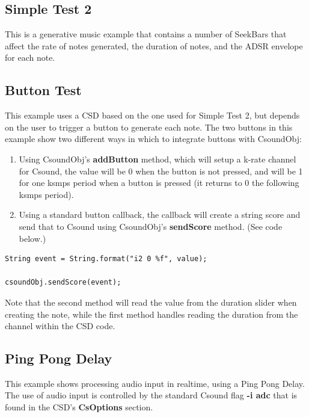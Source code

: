 \documentclass[11pt]{article}
\begin{document}
\subsection{Simple Test 2}

This is a generative music example that contains a number of SeekBars that affect the rate of notes generated, the duration of notes, and the ADSR envelope for each note. 


\subsection{Button Test}

This example uses a CSD based on the one used for Simple Test 2, but depends on the user to trigger a button to generate each note.  The two buttons in this example show two different ways in which to integrate buttons with CsoundObj:

\begin{enumerate}
\item Using CsoundObj's \textbf{addButton} method, which will setup a k-rate channel for Csound, the value will be 0 when the button is not pressed, and will be 1 for one ksmps period when a button is pressed (it returns to 0 the following ksmps period). 
\item Using a standard button callback, the callback will create a string score and send that to Csound using CsoundObj's \textbf{sendScore} method. (See code below.)
\end{enumerate}


\begin{lstlisting}[caption=Example code showing sending score text to CsoundObj]
String event = String.format("i2 0 %f", value);
									
csoundObj.sendScore(event);
\end{lstlisting}

Note that the second method will read the value from the duration slider when creating the note, while the first method handles reading the duration from the channel within the CSD code. 

\subsection{Ping Pong Delay}

This example shows processing audio input in realtime, using a Ping Pong Delay. The use of audio input is controlled by the standard Csound flag \textbf{-i adc} that is found in the CSD's \textbf{CsOptions} section.  
\end{document}
